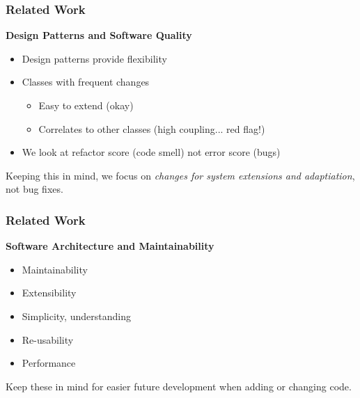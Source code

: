 \documentclass{beamer}
\begin{document}
\begin{frame}
  \frametitle{Related Work}
  \textbf{Design Patterns and Software Quality}
  \begin{itemize}
    \item Design patterns provide flexibility
    \item Classes with frequent changes
    \begin{itemize}
      \item Easy to extend (okay)
      \item Correlates to other classes (high coupling... red flag!)
    \end{itemize}
    \item We look at refactor score (code smell) not error score (bugs)
  \end{itemize}
  
  \vspace{0.35cm}
  Keeping this in mind, we focus on \emph{changes for system extensions and adaptiation}, not bug fixes.
\end{frame}

\begin{frame}
  \frametitle{Related Work}
  \textbf{Software Architecture and Maintainability}
  \begin{itemize}
    \item Maintainability
    \item Extensibility
    \item Simplicity, understanding
    \item Re-usability
    \item Performance
  \end{itemize}

  \vspace{0.35cm}
  Keep these in mind for easier future development 
  \newline when adding or changing code.
\end{frame}
\end{document}

